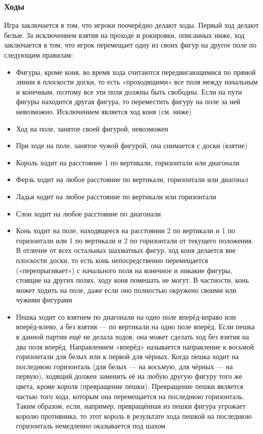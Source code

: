 \subsubsection*{Ходы}
Игра заключается в том, что игроки поочерёдно делают ходы. Первый ход делают белые. За исключением взятия на проходе и рокировки, описанных ниже, ход заключается в том, что игрок перемещает одну из своих фигур на другое поле по следующим правилам:\\
\begin{itemize}
\item Фигуры, кроме коня, во время хода считаются передвигающимися по прямой линии в плоскости доски, то есть «проходящими» все поля между начальным и конечным, поэтому все эти поля должны быть свободны. Если на пути фигуры находится другая фигура, то переместить фигуру на поле за ней невозможно. Исключением является ход коня (см. ниже)\\
\item Ход на поле, занятое своей фигурой, невозможен\\
\item При ходе на поле, занятое чужой фигурой, она снимается с доски (взятие)\\
\item Король ходит на расстояние 1 по вертикали, горизонтали или диагонали\\
\item Ферзь ходит на любое расстояние по вертикали, горизонтали или диагонал\\
\item Ладья ходит на любое расстояние по вертикали или горизонтали\\
\item Слон ходит на любое расстояние по диагонали\\
\item Конь ходит на поле, находящееся на расстоянии 2 по вертикали и 1 по горизонтали или 1 по вертикали и 2 по горизонтали от текущего положения. В отличие от всех остальных шахматных фигур, ход коня делается вне плоскости доски, то есть конь непосредственно перемещается («перепрыгивает») с начального поля на конечное и никакие фигуры, стоящие на других полях, ходу коня помешать не могут. В частности, конь может ходить на поле, даже если оно полностью окружено своими или чужими фигурами\\
\item Пешка ходит со взятием по диагонали на одно поле вперёд-вправо или вперёд-влево, а без взятия — по вертикали на одно поле вперёд. Если пешка в данной партии ещё не делала ходов, она может сделать ход без взятия на два поля вперёд. Направлением «вперёд» называется направление к восьмой горизонтали для белых или к первой для чёрных. Когда пешка ходит на последнюю горизонталь (для белых — на восьмую, для чёрных — на первую), ходящий должен заменить её на любую другую фигуру того же цвета, кроме короля (превращение пешки). Превращение пешки является частью того хода, которым она перемещается на последнюю горизонталь. Таким образом, если, например, превращённая из пешки фигура угрожает королю противника, то этот король в результате хода пешкой на последнюю горизонталь немедленно оказывается под шахом\\

\end{itemize}
